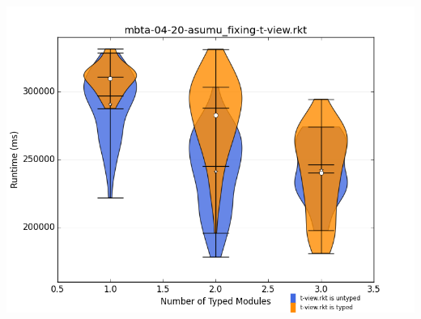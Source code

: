 \documentclass{article}
\begin{document}
\includegraphics[width=\textwidth]{mbta-04-20-asumu_fixing-t-view.rkt-dv.png}
\end{document}
